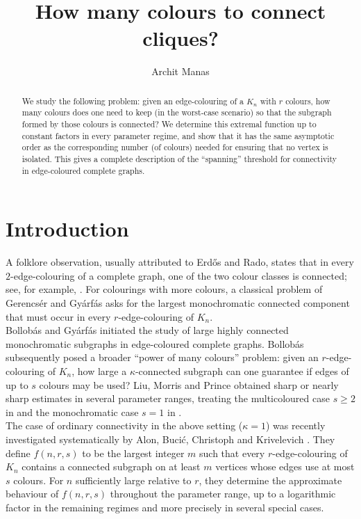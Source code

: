 \documentclass[11pt,a4paper]{article}
\title{How many colours to connect cliques?}
\author{Archit Manas}
\date{\vspace{-2ex}}
\begin{document}
\maketitle
\begin{abstract}
We study the following problem: given an edge-colouring of a $K_n$ with $r$ colours, how many colours does one need to keep (in the worst-case scenario) so that the subgraph formed by those colours is connected? We determine this extremal function up to constant factors in every parameter regime, and show that it has the same asymptotic order as the corresponding number (of colours) needed for ensuring that no vertex is isolated. This gives a complete description of the ``spanning'' threshold for connectivity in edge-coloured complete graphs.
\end{abstract}
\section{Introduction}
A folklore observation, usually attributed to Erd\H{o}s and Rado, states that in every $2$-edge-colouring of a complete graph, one of the two colour classes is connected; see, for example, \cite{GyarfasSurvey2011}. For colourings with more colours, a classical problem of Gerencs\'er and Gy\'arf\'as \cite{GerencserGyarfas1967} asks for the largest monochromatic connected component that must occur in every $r$-edge-colouring of $K_n$. \\

\noindent
Bollob\'as and Gy\'arf\'as \cite{BollobasGyarfas2008} initiated the study of large highly connected monochromatic subgraphs in edge-coloured complete graphs. Bollob\'as subsequently posed a broader ``power of many colours'' problem: given an $r$-edge-colouring of $K_n$, how large a $\kappa$-connected subgraph can one guarantee if edges of up to $s$ colours may be used? Liu, Morris and Prince obtained sharp or nearly sharp estimates in several parameter ranges, treating the multicoloured case $s\geq 2$ in \cite{LMP2008} and the monochromatic case $s=1$ in \cite{LMP2009}. \\

\noindent
The case of ordinary connectivity in the above setting ($\kappa=1$) was recently investigated systematically by Alon, Buci\'c, Christoph and Krivelevich \cite{ABCK2024}. They define $f(n,r,s)$ to be the largest integer $m$ such that every $r$-edge-colouring of $K_n$ contains a connected subgraph on at least $m$ vertices whose edges use at most $s$ colours. For $n$ sufficiently large relative to $r$, they determine the approximate behaviour of $f(n,r,s)$ throughout the parameter range, up to a logarithmic factor in the remaining regimes and more precisely in several special cases. \\
\end{document}
